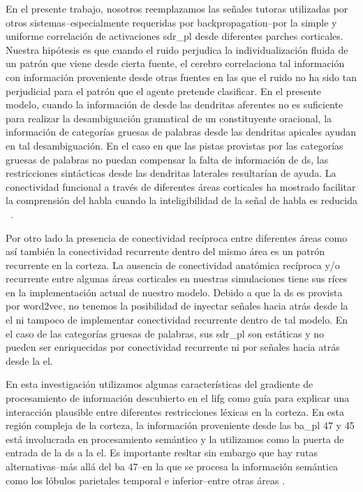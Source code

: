 En el presente trabajo, nosotros reemplazamos las señales tutoras utilizadas por otros sistemas--especialmente requeridas por backpropagation--por la simple y uniforme correlación de activaciones \gls{sdr_pl} desde diferentes parches corticales.
Nuestra hipótesis es que cuando el ruido perjudica la individualización fluida de un patrón que viene desde cierta fuente, el cerebro correlaciona tal información con información proveniente desde otras fuentes en las que el ruido no ha sido tan perjudicial para el patrón que el agente pretende clasificar.
En el presente modelo, cuando la información de  desde las dendritas aferentes no es suficiente para realizar la desambiguación gramatical de un constituyente oracional, la información de categorías gruesas de palabras desde las dendritas apicales ayudan en tal desambiguación.
En el caso en que las pistas provistas por las categorías gruesas de palabras no puedan compensar la falta de información de \gls{ds}, las restricciones sintácticas desde las dendritas laterales resultarían de ayuda.
La conectividad funcional a través de diferentes áreas corticales ha mostrado facilitar la comprensión del habla cuando la inteligibilidad de la señal de habla es reducida ~\cite{Obleser2283}.

Por otro lado la presencia de conectividad recíproca entre diferentes áreas como así también la conectividad recurrente dentro del mismo área es un patrón recurrente en la corteza.
La ausencia de conectividad anatómica recíproca y/o recurrente entre algunas áreas corticales en nuestras simulaciones tiene sus ríces en la implementación actual de nuestro modelo.
Debido a que la \gls{ds} es provista por word2vec, no tenemos la posibilidad de inyectar señales hacia atrás desde la \gls{el} ni tampoco de implementar conectividad recurrente dentro de tal modelo.
En el caso de las categorías gruesas de palabras, sus \gls{sdr_pl} son estáticas y no pueden ser enriquecidas por conectividad recurrente ni por señales hacia atrás desde la \gls{el}.

En esta investigación utilizamos algunas características del gradiente de procesamiento de información descubierto en el \gls{lifg} como guía para explicar una interacción plausible entre diferentes restricciones léxicas en la corteza.
En esta región compleja de la corteza, la información proveniente desde las \gls{ba_pl} 47 y 45 está involucrada en procesamiento semántico \cite{GOUCHA2015294, DECARLI2007933, PMID:15528098, NEWMAN201051} y la utilizamos como la puerta de entrada de la \gls{ds} a la \gls{el}.
Es importante resltar sin embargo que hay rutas alternativas--más allá del \gls{ba} 47--en la que se procesa la información semántica
como los lóbulos parietales temporal e inferior--entre otras áreas \cite{Binder2011TheNO}.

